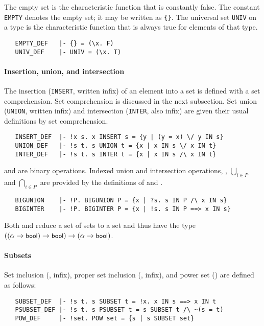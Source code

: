 The empty set is the characteristic function that is constantly
false. The constant {\small\verb+EMPTY+} denotes the empty set; it may
be written as {\small\verb+{}+}. The universal set {\small\verb+UNIV+}
on a type is the characteristic function that is always true for
elements of that type.
\begin{hol}
\begin{verbatim}
   EMPTY_DEF   |- {} = (\x. F)
   UNIV_DEF    |- UNIV = (\x. T)
\end{verbatim}
\end{hol}

\paragraph{Insertion, union, and intersection}

The insertion ({\small\verb+INSERT+}, written infix) of an element
into a set is defined with a set comprehension. Set comprehension is
discussed in the next subsection. Set union ({\small\verb+UNION+},
written infix) and intersection ({\small\verb+INTER+}, also infix)
are given their usual definitions by set comprehension.
\begin{hol}
\begin{verbatim}
   INSERT_DEF  |- !x s. x INSERT s = {y | (y = x) \/ y IN s}
   UNION_DEF   |- !s t. s UNION t = {x | x IN s \/ x IN t}
   INTER_DEF   |- !s t. s INTER t = {x | x IN s /\ x IN t}
\end{verbatim}
\end{hol}
 and  are binary
operations. Indexed union and intersection operations, \ie,
$\bigcup_{i \in P}$ and $\bigcap_{i \in P}$ are provided by the
definitions of   and .
\begin{hol}
\begin{verbatim}
   BIGUNION    |- !P. BIGUNION P = {x | ?s. s IN P /\ x IN s}
   BIGINTER    |- !P. BIGINTER P = {x | !s. s IN P ==> x IN s}
\end{verbatim}
\end{hol}
Both  and  reduce a set of sets to a
set and thus have the type
$((\alpha\to\mbox{\small{\textbf{\sf{bool}}}})\to\mbox{\small{\textbf{\sf{bool}}}})\to (\alpha\to\mbox{\small{\textbf{\sf{bool}}}})$.

\paragraph{Subsets}

Set inclusion (, infix), proper set inclusion
(, infix), and power set () 
are defined as follows:
%
\begin{hol}
\begin{verbatim}
   SUBSET_DEF  |- !s t. s SUBSET t = !x. x IN s ==> x IN t
   PSUBSET_DEF |- !s t. s PSUBSET t = s SUBSET t /\ ~(s = t)
   POW_DEF     |- !set. POW set = {s | s SUBSET set}
\end{verbatim}
\end{hol}

